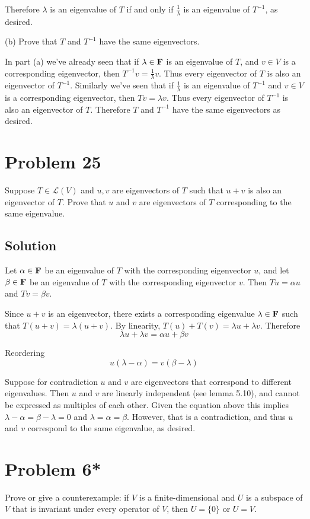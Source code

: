 \documentclass{article}
\begin{document}
Therefore $\lambda$ is an eigenvalue of $T$ if and only if $\frac{1}{\lambda}$ is an eigenvalue of $T^{-1}$, as desired.

\vs

(b) Prove that $T$ and $T^{-1}$ have the same eigenvectors.

In part (a) we've already seen that if $\lambda\in\mathbf{F}$ is an eigenvalue of $T$, and $v\in V$ is a corresponding eigenvector, then $T^{-1}v=\frac{1}{\lambda}v$. Thus every eigenvector of $T$ is also an eigenvector of $T^{-1}$. Similarly we've seen that if $\frac{1}{\lambda}$ is an eigenvalue of $T^{-1}$ and $v\in V$ is a corresponding eigenvector, then $Tv=\lambda v$. Thus every eigenvector of $T^{-1}$ is also an eigenvector of $T$. Therefore $T$ and $T^{-1}$ have the same eigenvectors as desired.

\section*{Problem 25}
Suppose $T\in\mathcal{L}(V)$ and $u,v$ are eigenvectors of $T$ such that $u+v$ is also an eigenvector of $T$. Prove that $u$ and $v$ are eigenvectors of $T$ corresponding to the same eigenvalue.

\subsection*{Solution}
Let $\alpha\in\mathbf{F}$ be an eigenvalue of $T$ with the corresponding eigenvector $u$, and let $\beta\in\mathbf{F}$ be an eigenvalue of $T$ with the corresponding eigenvector $v$. Then $Tu=\alpha u$ and $Tv=\beta v$.

\vs

Since $u+v$ is an eigenvector, there exists a corresponding eigenvalue $\lambda\in\mathbf{F}$ such that $T(u+v)=\lambda(u+v)$. By linearity, $T(u)+T(v)=\lambda u + \lambda v$. Therefore
\[\lambda u+\lambda v=\alpha u+\beta v\]

Reordering
\[u(\lambda-\alpha)=v(\beta-\lambda)\]

Suppose for contradiction $u$ and $v$ are eigenvectors that correspond to different eigenvalues. Then $u$ and $v$ are linearly independent (see lemma 5.10), and cannot be expressed as multiples of each other. Given the equation above this implies $\lambda-\alpha=\beta-\lambda=0$ and $\lambda=\alpha=\beta$. However, that is a contradiction, and thus $u$ and $v$ correspond to the same eigenvalue, as desired.

\section*{Problem 6*}
Prove or give a counterexample: if $V$ is a finite-dimensional and $U$ is a subspace of $V$ that is invariant under every operator of $V$, then $U=\{0\}$ or $U=V$.
\end{document}
